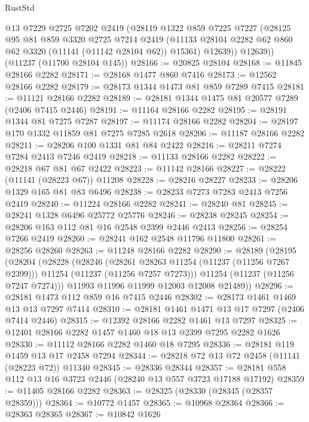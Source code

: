 \begin{lexlean}{RustStd}
\begin{coremodule}
        @13
        @7229
        @2725
        @7202
        @2419
        (@28119
          @1322
          @859
          @7225
          @7227
          (@28125
            @95
            @81
            @859
            @3320
            @2725
            @7214
            @2419
            (@11133 @28104 @2282 @62 @860 @62 @3320 (@11141 (@11142 @28104 @62)) @15361)
            @12639))
        @12639))
    (@11237 (@11700 @28104 @145))
@28166 := @20825 @28104
@28168 := @11845 @28166 @2282
@28171 := @28168 @1477 @860 @7416
@28173 := @12562 @28166 @2282
@28179 := @28173 @1344 @1473 @81 @859 @7289 @7415
@28181 := @11121 @28166 @2282
@28189 := @28181 @1344 @1475 @81 @20577 @7289 (@2406 @7415 @2446)
@28191 := @11164 @28166 @2282
@28195 := @28191 @1344 @81 @7275 @7287
@28197 := @11174 @28166 @2282
@28204 := @28197 @170 @1332 @11859 @81 @7275 @7285 @2618
@28206 := @11187 @28166 @2282
@28211 := @28206 @100 @1331 @81 @84 @2422
@28216 := @28211 @7274 @7284 @2413 @7246 @2419
@28218 := @11133 @28166 @2282
@28222 := @28218 @67 @81 @67 @2422
@28223 := @11142 @28166
@28227 := @28222 (@11141 (@28223 @67)) @11208
@28228 := @28216 @28227
@28233 := @28206 @1329 @165 @81 @83 @6496
@28238 := @28233 @7273 @7283 @2413 @7256 @2419
@28240 := @11224 @28166 @2282
@28241 := @28240 @81
@28245 := @28241 @1328 @6496 @25772 @25776
@28246 := @28238 @28245
@28254 := @28206 @163 @112 @81 @16 @2548 @2399 @2446 @2413
@28256 := @28254 @7266 @2419
@28260 := @28241 @162 @2548 @11796 @11800
@28261 := @28256 @28260
@28263 := @11248 @28166 @2282
@28290 := @28189
    (@28195
      (@28204
        (@28228
          (@28246
            (@28261 @28263 @11254 (@11237 (@11256 @7267 @2399)))
            @11254
            (@11237 (@11256 @7257 @7273)))
          @11254
          (@11237 (@11256 @7247 @7274)))
        @11993
        @11996
        @11999
        @12003
        @12008
        @21489))
@28296 := @28181 @1473 @112 @859 @16 @7415 @2446
@28302 := @28173 @1461 @1469 @13 @13 @7297 @7414
@28310 := @28181 @1461 @1471 @13 @17 @7297 (@2406 @7414 @2446)
@28315 := @12392 @28166 @2282 @1461 @13 @7297
@28325 := @12401 @28166 @2282 @1457 @1460 @18 @13 @2399 @7295 @2282 @1626
@28330 := @11112 @28166 @2282 @1460 @18 @7295
@28336 := @28181 @119 @1459 @13 @17 @2458 @7294
@28344 := @28218 @72 @13 @72 @2458 (@11141 (@28223 @72)) @11340
@28345 := @28336 @28344
@28357 := @28181 @558 @112 @13 @16 @3723 @2446 (@28240 @13 @557 @3723 @17188 @17192)
@28359 := @11405 @28166 @2282
@28363 := @28325 (@28330 (@28345 (@28357 @28359)))
@28364 := @10772 @1457
@28365 := @10968 @28364
@28366 := @28363 @28365
@28367 := @10842 @1626

\end{coremodule}
\end{lexlean}
